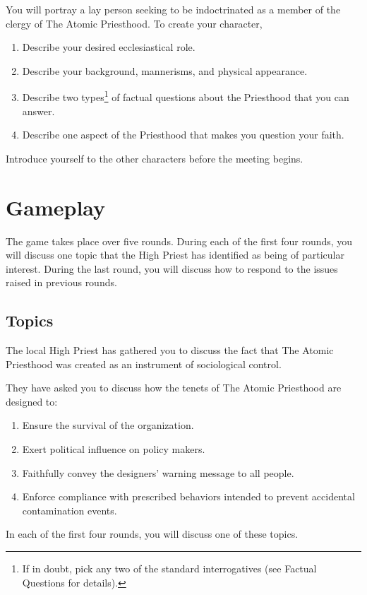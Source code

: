 \documentclass[a6paper, 11pt, parskip=half, DIV=15]{scrartcl}
\begin{document}
You will portray a lay person seeking to be indoctrinated as a member of the clergy of The Atomic Priesthood. To create your character,
\begin{enumerate}[nosep]
	\item Describe your desired ecclesiastical role.
	\item Describe your background, mannerisms, and physical appearance.
	\item Describe two types\footnote[1]{\raggedright If in doubt, pick any two of the standard interrogatives (see {\setmainfont{Stalinist One}\scriptsize Factual Questions} for details).} of factual questions about the Priesthood that you can answer.
	\item Describe one aspect of the Priesthood that makes you question your faith.
\end{enumerate}
Introduce yourself to the other characters before the meeting begins.

\section*{Gameplay}
The game takes place over five rounds. 
During each of the first four rounds, you will discuss one topic that the High Priest has identified as being of particular interest.
During the last round, you will discuss how to respond to the issues raised in previous rounds. 

\newpage
\enlargethispage{1.75\baselineskip}

\subsection*{Topics}
The local High Priest has gathered you to discuss the fact that The Atomic Priesthood was created as an instrument of sociological control.

They have asked you to discuss how the tenets of The Atomic Priesthood are designed to:
\begin{enumerate}[nosep]
	\item Ensure the survival of the organization.
	\item Exert political influence on policy makers.
	\item Faithfully convey the designers' warning message to all people.
	\item Enforce compliance with prescribed behaviors intended to prevent accidental contamination events.
\end{enumerate}
In each of the first four rounds, you will discuss one of these topics.
\end{document}
